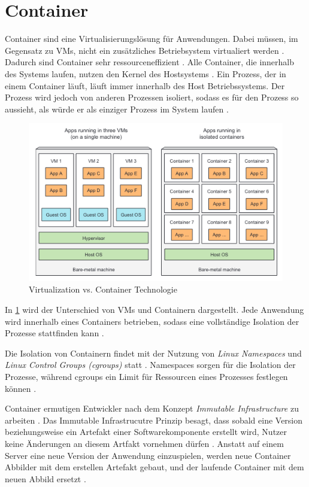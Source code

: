\section{Container}
\label{sec:grundlagen:container}
Container sind eine Virtualisierungslösung für Anwendungen.
Dabei müssen, im Gegensatz zu \acfp{VM}, nicht ein zusätzliches Betriebsystem virtualiert werden \cite{Marko2018}.
Dadurch sind Container sehr ressourceneffizient \cite{Kane2018}.
Alle Container, die innerhalb des Systems laufen, nutzen den Kernel des Hostsystems \cite{Marko2018}.
Ein Prozess, der in einem Container läuft, läuft immer innerhalb des Host Betriebssystems.
Der Prozess wird jedoch von anderen Prozessen isoliert, sodass es für den Prozess so aussieht, als würde er
als einziger Prozess im System laufen \cite{Marko2018}.

\begin{figure}
  \includegraphics[width=\textwidth]{gfx/chapters/2_grundlagen/container-vs-vm.png}
  \caption{Virtualization vs. Container Technologie}
  \label{fig:container:vergleich}
\end{figure}

In \ref{fig:container:vergleich} wird der Unterschied von \acp{VM} und Containern dargestellt. 
Jede Anwendung wird innerhalb eines Containers betrieben, sodass eine vollständige Isolation der Prozesse
stattfinden kann \cite{Marko2018}.

Die Isolation von Containern findet mit der Nutzung von \emph{Linux Namespaces} und \emph{Linux Control Groups (cgroups)} statt \cite{Marko2018}.
Namespaces sorgen für die Isolation der Prozesse, 
während cgroups ein Limit für Ressourcen eines Prozesses festlegen können \cite{Marko2018}.

Container ermutigen Entwickler nach dem Konzept \emph{Immutable Infrastructure} zu arbeiten \cite{Burns2019}.
Das Immutable Infrastrucutre Prinzip besagt, dass sobald eine Version beziehungsweise ein Artefakt einer Softwarekomponente erstellt wird,
Nutzer keine Änderungen an diesem Artfakt vornehmen dürfen \cite{Burns2019}. 
Anstatt auf einem Server eine neue Version der Anwendung einzuspielen, werden neue Container Abbilder mit dem erstellen Artefakt gebaut, 
und der laufende Container mit dem neuen Abbild ersetzt \cite{Burns2019}.

